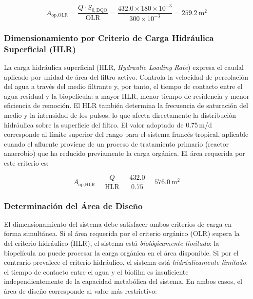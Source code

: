 \begin{equation}
A_\text{op,OLR} = \frac{Q \cdot S_{0,\text{DQO}}}{\text{OLR}} = \frac{432.0 \times 180 \times 10^{-3}}{300 \times 10^{-3}} = 259.2\ \text{m}^2
\end{equation}

\subsubsection*{Dimensionamiento por Criterio de Carga Hidráulica Superficial (HLR)}

La carga hidráulica superficial (HLR, \textit{Hydraulic Loading Rate}) expresa el caudal aplicado por unidad de área del filtro activo. Controla la velocidad de percolación del agua a través del medio filtrante y, por tanto, el tiempo de contacto entre el agua residual y la biopelícula: a mayor HLR, menor tiempo de residencia y menor eficiencia de remoción. El HLR también determina la frecuencia de saturación del medio y la intensidad de los pulsos, lo que afecta directamente la distribución hidráulica sobre la superficie del filtro. El valor adoptado de 0.75\,m/d corresponde al límite superior del rango para el sistema francés tropical, aplicable cuando el afluente proviene de un proceso de tratamiento primario (reactor anaerobio) que ha reducido previamente la carga orgánica. El área requerida por este criterio es:

\begin{equation}
A_\text{op,HLR} = \frac{Q}{\text{HLR}} = \frac{432.0}{0.75} = 576.0\ \text{m}^2
\end{equation}

\subsubsection*{Determinación del Área de Diseño}

El dimensionamiento del sistema debe satisfacer ambos criterios de carga en forma simultánea. Si el área requerida por el criterio orgánico (OLR) supera la del criterio hidráulico (HLR), el sistema está \textit{biológicamente limitado}: la biopelícula no puede procesar la carga orgánica en el área disponible. Si por el contrario prevalece el criterio hidráulico, el sistema está \textit{hidráulicamente limitado}: el tiempo de contacto entre el agua y el biofilm es insuficiente independientemente de la capacidad metabólica del sistema. En ambos casos, el área de diseño corresponde al valor más restrictivo:

